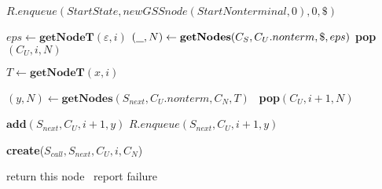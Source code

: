 \begin{algorithmic}
	\State $R.enqueue(StartState, new GSSnode(StartNonterminal,0), 0, \$)$
	
		\State $eps \gets \textbf{getNodeT}(\varepsilon, i)$  
		\State $(\underline{\hspace{0.25cm}}, N) \gets \textbf{getNodes}(C_{S},C_{U}.nonterm, \$, eps)$
		\State \textbf{pop}$(C_{U},i,N)$ 
	\EndIf
	
			\State $T \gets \textbf{getNodeT}(x, i)$
	
			\State $(y, N) \gets \textbf{getNodes}(S_{next},C_{U}.nonterm, C_{N}, T)$
				\ \textbf{pop}$(C_{U},i+1,N)$ 
			\EndIf
	
				\State $\textbf{add}(S_{next}, C_{U}, i + 1, y)$
			\Else
				\State $R.enqueue(S_{next}, C_{U}, i + 1, y)$
			\EndIf
		\EndCase
	
			\State \textbf{create}($S_{call}, S_{next}, C_{U}, i, C_{N}$)
		\EndCase
		\EndSwitch
	
	\EndFor
	\EndWhile
		\State return this node
	\Else
		\ report failure
	\EndIf
\EndFunction
\end{algorithmic}